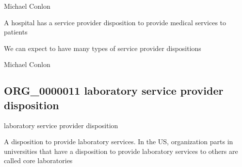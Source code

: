 \documentclass[letterpaper,10pt,english]{sphinxmanual}
\begin{document}
\begin{sphinxShadowBox}

\sphinxAtStartPar
Michael Conlon 
\end{sphinxShadowBox}

\begin{sphinxShadowBox}

\sphinxAtStartPar
A hospital has a service provider disposition to provide medical services to patients
\end{sphinxShadowBox}

\begin{sphinxShadowBox}

\sphinxAtStartPar
We can expect to have many types of service provider dispositions
\end{sphinxShadowBox}

\begin{sphinxShadowBox}

\sphinxAtStartPar
Michael Conlon 
\end{sphinxShadowBox}
\begin{quote}

\ignorespaces \end{quote}


\subsection{ORG\_0000011 \sphinxhyphen{} laboratory service provider disposition}
\label{\detokenize{doc-ORG_0000011:org-0000011-laboratory-service-provider-disposition}}\label{\detokenize{doc-ORG_0000011:index-0}}\label{\detokenize{doc-ORG_0000011::doc}}
\begin{sphinxShadowBox}

\sphinxAtStartPar
laboratory service provider disposition
\end{sphinxShadowBox}

\begin{sphinxShadowBox}

\sphinxAtStartPar
A disposition to provide laboratory services.  In the US, organization parts in universities that have a disposition to provide laboratory services to others are called core laboratories
\end{sphinxShadowBox}
\end{document}
